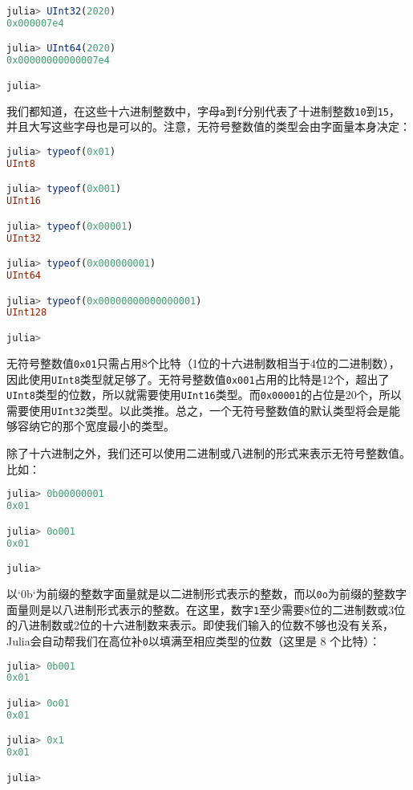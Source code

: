 \begin{lstlisting}[language=julia]
julia> UInt32(2020)
0x000007e4

julia> UInt64(2020)
0x00000000000007e4

julia> 
\end{lstlisting}

我们都知道，在这些十六进制整数中，字母\verb`a`到\verb`f`分别代表了十进制整数\verb`10`到\verb`15`，并且大写这些字母也是可以的。注意，无符号整数值的类型会由字面量本身决定：

\begin{lstlisting}[language=julia]
julia> typeof(0x01)
UInt8

julia> typeof(0x001)
UInt16

julia> typeof(0x00001)
UInt32

julia> typeof(0x000000001)
UInt64

julia> typeof(0x00000000000000001)
UInt128

julia> 
\end{lstlisting}

无符号整数值\verb`0x01`只需占用8个比特（1位的十六进制数相当于4位的二进制数），因此使用\verb`UInt8`类型就足够了。无符号整数值\verb`0x001`占用的比特是12个，超出了\verb`UInt8`类型的位数，所以就需要使用\verb`UInt16`类型。而\verb`0x00001`的占位是20个，所以需要使用\verb`UInt32`类型。以此类推。总之，一个无符号整数值的默认类型将会是能够容纳它的那个宽度最小的类型。

除了十六进制之外，我们还可以使用二进制或八进制的形式来表示无符号整数值。比如：

\begin{lstlisting}[language=julia]
julia> 0b00000001
0x01

julia> 0o001
0x01

julia> 
\end{lstlisting}

以`0b`为前缀的整数字面量就是以二进制形式表示的整数，而以\verb`0o`为前缀的整数字面量则是以八进制形式表示的整数。在这里，数字\verb`1`至少需要8位的二进制数或3位的八进制数或2位的十六进制数来表示。即使我们输入的位数不够也没有关系，Julia会自动帮我们在高位补\verb`0`以填满至相应类型的位数（这里是 8 个比特）：

\begin{lstlisting}[language=julia]
julia> 0b001
0x01

julia> 0o01
0x01

julia> 0x1
0x01

julia>
\end{lstlisting}

